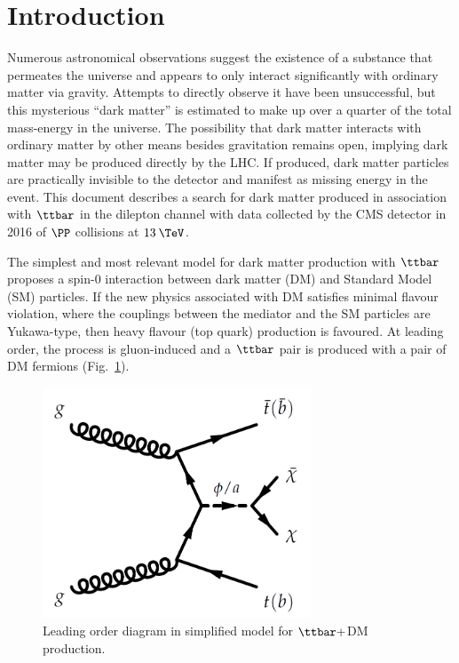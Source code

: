 \section{Introduction}

Numerous astronomical observations suggest the existence of a substance that permeates the universe and appears to only interact significantly with ordinary matter via gravity. 
Attempts to directly observe it have been unsuccessful, but this mysterious ``dark matter'' is estimated to make up over a quarter of the total mass-energy in the universe. 
The possibility that dark matter interacts with ordinary matter by other means besides gravitation remains open, implying dark matter may be produced directly by the LHC. 
If produced, dark matter particles are practically invisible to the detector and manifest as missing energy in the event. 
This document describes a search for dark matter produced in association with $\ttbar$ in the dilepton channel with data collected by the CMS detector in 2016 of $\PP$ collisions at $13\:\TeV$.

The simplest and most relevant model for dark matter production with $\ttbar$ proposes a spin-$0$ interaction between dark matter (DM) and Standard Model (SM) particles. 
If the new physics associated with DM satisfies minimal flavour violation, where the couplings between the mediator and the SM particles are Yukawa-type, then heavy flavour (top quark) production is favoured. 
At leading order, the process is gluon-induced and a $\ttbar$ pair is produced with a pair of DM fermions (Fig.~\ref{fig:ttdm_diagram}). 

\begin{figure}
\centering\includegraphics[width=8cm]{figures/ttbarDM.png}
\caption{Leading order diagram in simplified model for $\ttbar+$DM production.}
\label{fig:ttdm_diagram}
\end{figure}

